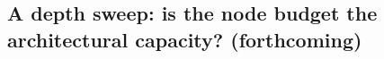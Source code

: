 \documentclass[11pt,a4paper]{article}
\begin{document}
\subsection{A depth sweep: is the node budget the architectural capacity? (forthcoming)}
\label{sec:res-depth}
\end{document}
